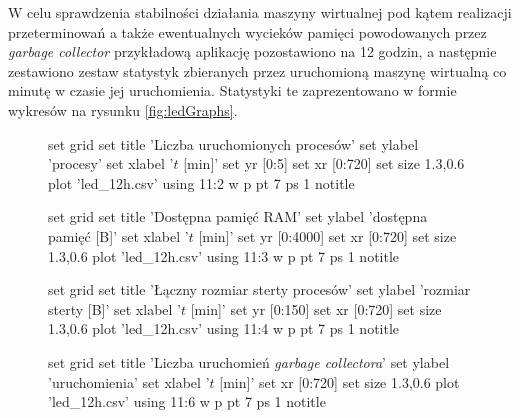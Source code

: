 W celu sprawdzenia stabilności działania maszyny wirtualnej pod kątem realizacji przeterminowań a także ewentualnych wycieków pamięci powodowanych przez \emph{garbage collector} przykładową aplikację pozostawiono na 12 godzin, a następnie zestawiono zestaw statystyk zbieranych przez uruchomioną maszynę wirtualną co minutę w czasie jej uruchomienia.
Statystyki te zaprezentowano w formie wykresów na rysunku \ref{fig:ledGraphs}.

\begin{figure}
\begin{gnuplot}[terminal=epslatex,terminaloptions=color]
	set grid
	set title 'Liczba uruchomionych procesów'
	set ylabel 'procesy'
	set xlabel '$t$ [min]'
	set yr [0:5]
	set xr [0:720]
	set size 1.3,0.6
	plot 'led_12h.csv' using 11:2 w p pt 7 ps 1 notitle
\end{gnuplot}

\begin{gnuplot}[terminal=epslatex,terminaloptions=color]
	set grid
	set title 'Dostępna pamięć RAM'
	set ylabel 'dostępna pamięć [B]'
	set xlabel '$t$ [min]'
	set yr [0:4000]
	set xr [0:720]
	set size 1.3,0.6
	plot 'led_12h.csv' using 11:3 w p pt 7 ps 1 notitle
\end{gnuplot}

\begin{gnuplot}[terminal=epslatex,terminaloptions=color]
	set grid
	set title 'Łączny rozmiar sterty procesów'
	set ylabel 'rozmiar sterty [B]'
	set xlabel '$t$ [min]'
	set yr [0:150]
	set xr [0:720]
	set size 1.3,0.6
	plot 'led_12h.csv' using 11:4 w p pt 7 ps 1 notitle
\end{gnuplot}

\begin{gnuplot}[terminal=epslatex,terminaloptions=color]
	set grid
	set title 'Liczba uruchomień \emph{garbage collectora}'
	set ylabel 'uruchomienia'
	set xlabel '$t$ [min]'
	set xr [0:720]
	set size 1.3,0.6
	plot 'led_12h.csv' using 11:6 w p pt 7 ps 1 notitle
\end{gnuplot}
\end{figure}

